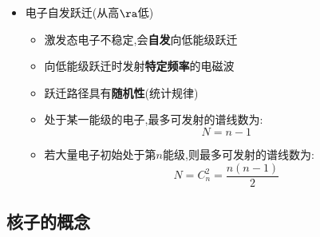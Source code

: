 \documentclass{article}
\begin{document}
\begin{itemize}
\begin{itemize}
\begin{minipage}{0.52\textwidth}
\begin{itemize}
\begin{itemize}
                                      \item 粒子碰撞: 允许$E \ge \triangle E$
                                  \end{itemize}

                            \item 电离:电子吸收足够能量脱离原子核束缚

                                  (对应能级$E_{\infty}=0$)
                        \end{itemize}
                    \end{minipage}
          \end{itemize}

    \item 电子自发跃迁(从高$\ra$低)
          \begin{itemize}
              \item 激发态电子不稳定,会\textbf{自发}向低能级跃迁

              \item 向低能级跃迁时发射\textbf{特定频率}的电磁波

              \item 跃迁路径具有\textbf{随机性}(统计规律)

              \item 处于某一能级的电子,最多可发射的谱线数为:
                    $$
                        N = n-1
                    $$
              \item 若大量电子初始处于第$n$能级,则最多可发射的谱线数为:
                    $$
                        N = C_n^2 = \frac{n(n-1)}{2}
                    $$
          \end{itemize}
\end{itemize}

\newpage


\subsection{核子的概念}
\end{document}

